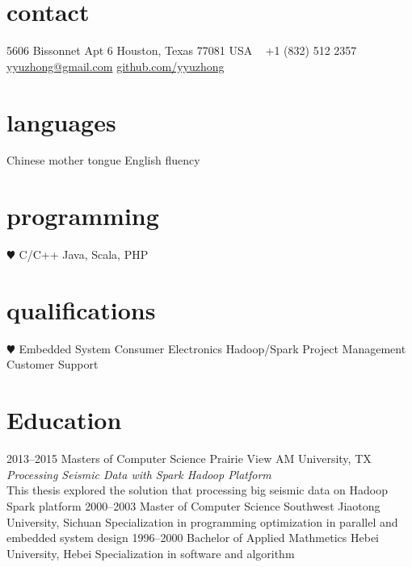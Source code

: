 \documentclass[]{friggeri-cv} %
\begin{document}


\begin{aside} %
\section{contact}
5606 Bissonnet Apt 6
Houston, Texas 77081
USA
~
+1 (832) 512 2357
~
\href{mailto:yyuzhong@gmail.com}{yyuzhong@gmail.com}
\href{http://github.com/yyuzhong}{github.com/yyuzhong}
\section{languages}
Chinese mother tongue
English fluency
\section{programming}
{\color{red} $\varheartsuit$} C/C++
Java, Scala, PHP
\section{qualifications}
{\color{red} $\varheartsuit$} Embedded System
Consumer Electronics
Hadoop/Spark
Project Management
Customer Support
\end{aside}


\section{Education}

\begin{entrylist}
\entry
{2013--2015}
{Masters {\normalfont of Computer Science}}
{Prairie View AM University, TX}
{ \emph{Processing Seismic Data with Spark Hadoop Platform} \\ This thesis explored the solution that processing big seismic data on Hadoop Spark platform}
\entry
{2000--2003}
{Master {\normalfont of Computer Science}}
{Southwest Jiaotong University, Sichuan}
{Specialization in programming optimization in parallel and embedded system design}
\entry
{1996--2000}
{Bachelor {\normalfont of Applied Mathmetics}}
{Hebei University, Hebei}
{Specialization in software and algorithm}
\end{entrylist}
\end{document}
